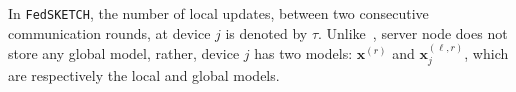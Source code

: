 \documentclass[11pt]{article}
\begin{document}
In \texttt{FedSKETCH}, the number of local updates, between two consecutive communication rounds, at device $j$ is denoted by $\tau$.
 Unlike~\cite{haddadpour2020federated}, server node does not store any global model, rather, device $j$ has two models: $\boldsymbol{x}^{(r)}$ and $\boldsymbol{x}^{(\ell,r)}_j$, which are respectively the local and global models. 
%
\end{document}
